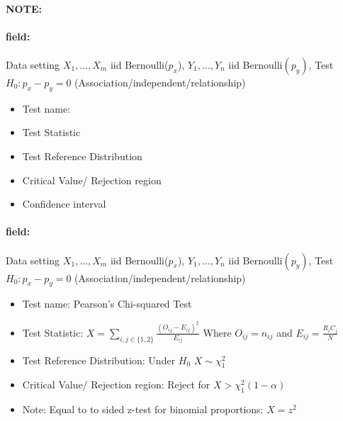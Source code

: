 \documentclass[12pt]{article}
\newenvironment{note}{\paragraph{NOTE:}}{}
\newenvironment{field}{\paragraph{field:}}{}
\begin{document}
\begin{note}
  \begin{field}
  Data setting $X_1, \ldots , X_m$ iid Bernoulli($p_x$), $Y_1, \ldots, Y_n$ iid Bernoulli$(p_y)$, Test $H_0: p_x - p_y = 0$ (Association/independent/relationship)
  \begin{itemize}
    \item Test name:
    \item Test Statistic
    \item Test Reference Distribution
    \item Critical Value/ Rejection region
    \item Confidence interval
  \end{itemize}
\end{field}
\begin{field}
Data setting $X_1, \ldots , X_m$ iid Bernoulli($p_x$), $Y_1, \ldots, Y_n$ iid Bernoulli$(p_y)$, Test $H_0: p_x - p_y = 0$ (Association/independent/relationship)
\begin{itemize}
  \item Test name: Pearson's Chi-squared Test
  \item Test Statistic: $X = \sum_{i,j \in \{1,2\}} \frac{(O_{ij} - E_{ij})^2}{E_{ij}}$ Where $O_{ij} = n_{ij}$ and $E_{ij} = \frac{R_iC_j}{N}$
  \item Test Reference Distribution: Under $H_0$ $X \sim \chi^2_1$
  \item Critical Value/ Rejection region: Reject for $X > \chi_1^2(1 - \alpha)$
  \item Note: Equal to to sided z-test for binomial proportions: $X = z^2$
\end{itemize}
\end{field}
\end{note}
\end{document}

